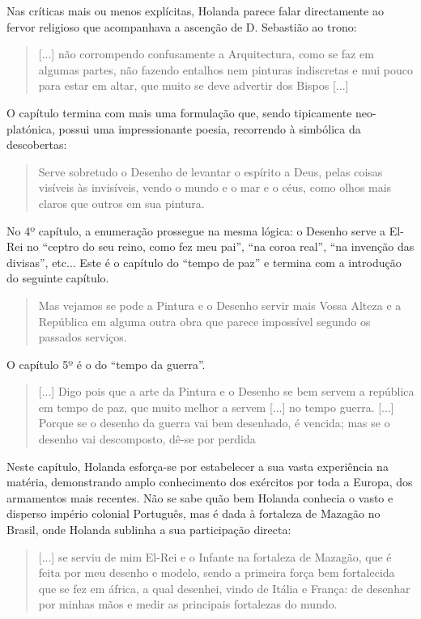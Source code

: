 \documentclass{article}
\begin{document}
Nas críticas mais ou menos explícitas, Holanda parece falar
directamente ao fervor religioso que acompanhava a ascenção de
D. Sebastião ao trono:

\begin{quote}
  [...] não corrompendo confusamente a Arquitectura, como se faz em
  algumas partes, não fazendo entalhos nem pinturas indiscretas e mui
  pouco para estar em altar, que muito se deve advertir dos Bispos
  [...] 
\end{quote}

O capítulo termina com mais uma formulação que, sendo tipicamente
neo-platónica, possui uma impressionante poesia, recorrendo à
simbólica da descobertas:

\begin{quote}
  Serve sobretudo o Desenho de levantar o espírito a Deus, pelas
  coisas visíveis às invisíveis, vendo o mundo e o mar e o céus, como
  olhos mais claros que outros em sua pintura.
\end{quote}

No 4º capítulo, a enumeração prossegue na mesma lógica: o Desenho
serve a El-Rei no ``ceptro do seu reino, como fez meu pai'', ``na
coroa real'', ``na invenção das divisas'', etc... Este é o capítulo do
``tempo de paz'' e termina com a introdução do seguinte capítulo.

\begin{quote}
  Mas vejamos se pode a Pintura e o Desenho servir mais Vossa Alteza e
  a República em alguma outra obra que parece impossível segundo os
  passados serviços.
\end{quote}

O capítulo 5º é o do ``tempo da guerra''.

\begin{quote}
  [...] Digo pois que a arte da Pintura e o Desenho se bem servem a
  república em tempo de paz, que muito melhor a servem [...] no tempo
  guerra. [...] Porque se o desenho da guerra vai bem desenhado, é
  vencida; mas se o desenho vai descomposto, dê-se por perdida
\end{quote}

Neste capítulo, Holanda esforça-se por estabelecer a sua vasta
experiência na matéria, demonstrando amplo conhecimento dos exércitos
por toda a Europa, dos armamentos mais recentes. Não se sabe quão bem
Holanda conhecia o vasto e disperso império colonial Português, mas é
dada à fortaleza de Mazagão no Brasil, onde Holanda sublinha a sua
participação directa:

\begin{quote}
  [...] se serviu de mim El-Rei e o Infante na fortaleza de Mazagão,
  que é feita por meu desenho e modelo, sendo a primeira força bem
  fortalecida que se fez em áfrica, a qual desenhei, vindo de Itália e
  França: de desenhar por minhas mãos e medir as principais fortalezas
  do mundo.
\end{quote}
\end{document}
